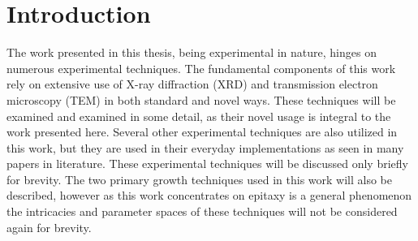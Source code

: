 \section{Introduction}
The work presented in this thesis, being experimental in nature, hinges on numerous experimental techniques.
The fundamental components of this work rely on extensive use of X-ray diffraction (XRD) and transmission electron microscopy (TEM) in both standard and novel ways.
These techniques will be examined and examined in some detail, as their novel usage is integral to the work presented here.
Several other experimental techniques are also utilized in this work, but they are used in their everyday implementations as seen in many papers in literature.
These experimental techniques will be discussed only briefly for brevity.
The two primary growth techniques used in this work will also be described, however as this work concentrates on epitaxy is a general phenomenon the intricacies and parameter spaces of these techniques will not be considered again for brevity.

